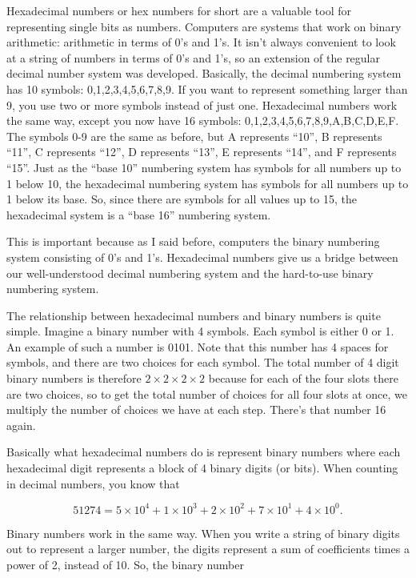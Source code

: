 Hexadecimal numbers or hex numbers for short are a valuable tool for
representing single bits as numbers. Computers are systems that work
on binary arithmetic: arithmetic in terms of 0's and 1's. It isn't
always convenient to look at a string of numbers in terms of 0's and
1's, so an extension of the regular decimal number system was developed.
Basically, the decimal numbering system has 10 symbols: 0,1,2,3,4,5,6,7,8,9.
If you want to represent something larger than 9, you use two or more
symbols instead of just one. Hexadecimal numbers work the same way,
except you now have 16 symbols: 0,1,2,3,4,5,6,7,8,9,A,B,C,D,E,F.
The symbols 0-9 are the same as before, but A represents ``10'',
B represents ``11'', C represents ``12'', D represents ``13'', 
E represents ``14'', and F represents ``15''. Just as the 
``base 10'' numbering system has symbols for all numbers up to
1 below 10, the hexadecimal numbering system has symbols for all
numbers up to 1 below its base. So, since there are symbols for
all values up to 15, the hexadecimal system is a ``base 16''
numbering system.

This is important because as  I said before, computers the binary
numbering system consisting of 0's and 1's. Hexadecimal numbers give
us a bridge between our well-understood decimal numbering system and
the hard-to-use binary numbering system. 

The relationship between hexadecimal numbers and binary numbers is
quite simple. Imagine a binary number with 4 symbols. Each symbol is
either 0 or 1. An example of such a number is 0101. Note that this
number has 4 spaces for symbols, and there are two choices for
each symbol. The total number of 4 digit binary numbers is
therefore $2\times 2\times 2\times 2$ because for each of the
four slots there are two choices, so to get the total number of
choices for all four slots at once, we multiply the number of
choices we have at each step. There's that number 16 again. 

Basically what hexadecimal numbers do is represent binary numbers
where each hexadecimal digit represents a block of 4 binary digits (or bits).
When counting in decimal numbers, you know that 

$$51274 = 5\times 10^{4} + 1\times 10^{3} + 2\times 10^{2} + 7\times 10^{1} + 4\times 10^{0}.$$

Binary numbers work in the same way. When you write a string of binary
digits out to represent a larger number, the digits represent a sum
of coefficients times a power of 2, instead of 10. So, the binary number


